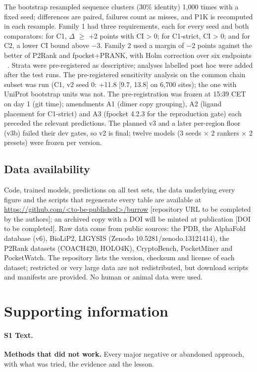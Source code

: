 \documentclass[10pt,letterpaper]{article}
\begin{document}
The bootstrap resampled sequence clusters (30\% identity) 1,000 times with a fixed seed; differences are paired, failures count as misses, and P1K is recomputed in each resample. Family 1 had three requirements, each for every seed and both comparators: for C1, $\Delta$ $\ge$ +2 points with CI \textgreater{} 0; for C1-strict, CI \textgreater{} 0; and for C2, a lower CI bound above $-$3. Family 2 used a margin of $-$2 points against the better of P2Rank and fpocket+PRANK, with Holm correction over six endpoints ~\cite{holm1979}. Strata were pre-registered as descriptive; analyses labelled post hoc were added after the test runs. The pre-registered sensitivity analysis on the common chain subset was run (C1, v2 seed 0: +11.8 [9.7, 13.8] on 6,700 sites); the one with UniProt bootstrap units was not. The pre-registration was frozen at 15:39 CET on day 1 (git time); amendments A1 (dimer copy grouping), A2 (ligand placement for C1-strict) and A3 (fpocket 4.2.3 for the reproduction gate) each preceded the relevant predictions. The planned v3 and a later per-region floor (v3b) failed their dev gates, so v2 is final; twelve models (3 seeds $\times$ 2 rankers $\times$ 2 presets) were frozen per version.

\subsection*{Data availability}

Code, trained models, predictions on all test sets, the data underlying every figure and the scripts that regenerate every table are available at \url{https://github.com/<to-be-published>/burrow} [repository URL to be completed by the authors]; an archived copy with a DOI will be minted at publication [DOI to be completed]. Raw data come from public sources: the PDB, the AlphaFold database (v6), BioLiP2, LIGYSIS (Zenodo 10.5281/zenodo.13121414), the P2Rank datasets (COACH420, HOLO4K), CryptoBench, PocketMiner and PocketWatch. The repository lists the version, checksum and license of each dataset; restricted or very large data are not redistributed, but download scripts and manifests are provided. No human or animal data were used.

\section*{Supporting information}

\paragraph*{S1 Text.}
\label{S1_Text}
{\bf Methods that did not work.} Every major negative or abandoned approach, with what was tried, the evidence and the lesson.
\end{document}
